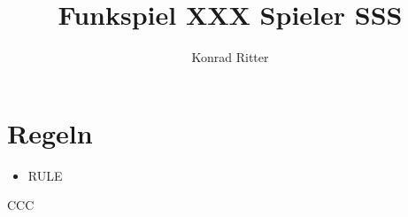 \documentclass[12pt,a4paper]{scrreprt}
\author{Konrad Ritter}
\title{Funkspiel XXX Spieler SSS}
\begin{document}
\maketitle
\section{Regeln}
\begin{itemize}
	\item RULE
\end{itemize}

CCC
\end{document}
